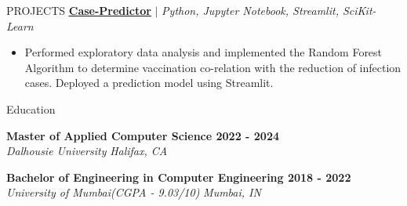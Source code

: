 \documentclass{resume} %
\begin{document}
\begin{rSection}{PROJECTS}
\href{https://github.com/RutvikJ77/Case-Predictor}{\textbf{\underline{Case-Predictor}}} $|$\textit{ Python, Jupyter Notebook, Streamlit, SciKit-Learn}
\begin{itemize}
    \item  Performed exploratory data analysis and implemented the Random Forest Algorithm to determine vaccination co-relation with the reduction of infection cases. Deployed a prediction model using Streamlit.
\end{itemize}


\end{rSection} 


\begin{rSection}{Education}

{\bf Master of Applied Computer Science \hfill {2022 - 2024}}\\
\textit{Dalhousie University} \hfill{\textit{Halifax, CA}}

{\bf Bachelor of Engineering in Computer Engineering \hfill {2018 - 2022}}\\
\textit{University of Mumbai(CGPA - 9.03/10)} \hfill{\textit{Mumbai, IN}}


\end{rSection}




\end{document}
